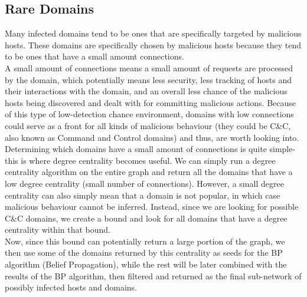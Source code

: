 \documentclass{article} %
\begin{document}
\subsection{Rare Domains}
Many infected domains tend to be ones that are specifically targeted by malicious hosts. These domains are specifically chosen by malicious hosts because they tend to be ones that have a small amount connections. \\
A small amount of connections means a small amount of requests are processed by the domain, which potentially means less security, less tracking of hosts and their interactions with the domain, and an overall 
less chance of the malicious hosts being discovered and dealt with for committing malicious actions. Because of this type of low-detection chance environment, domains with low connections could serve as a front 
for all kinds of malicious behaviour (they could be C\&C, also known as Command and Control domains) and thus, are worth looking into. \\
Determining which domains have a small amount of connections is quite simple- this is where degree centrality becomes useful. We can simply run a degree centrality algorithm on the entire graph and return all 
the domains that have a low degree centrality (small number of connections). However, a small degree centrality can also simply mean that a domain is not popular, in which case malicious behaviour cannot be inferred. 
Instead, since we are looking for possible C\&C domains, we create a bound and look for all domains that have a degree centrality within that bound. \\
Now, since this bound can potentially return a large portion of the graph, we then use some of the domains returned by this centrality as seeds for the BP algorithm (Belief Propagation), while the rest will be later 
combined with the results of the BP algorithm, then filtered and returned as the final sub-network of possibly infected hosts and domains. 
\end{document}
